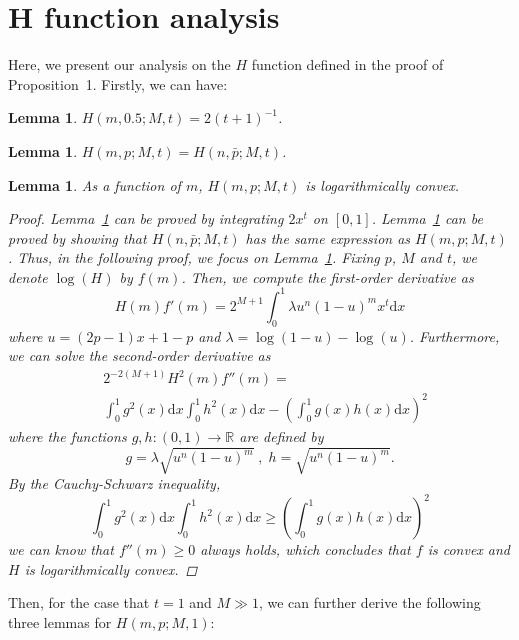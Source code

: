 \documentclass{article}
\newtheorem{lemma}[theorem]{Lemma}
\begin{document}
\section{H function analysis}
Here, we present our analysis on the $H$ function defined in the proof of Proposition~1.
Firstly, we can have:
\begin{lemma}
\label{MidPoint}
$H(m,0.5;M,t) = 2(t+1)^{-1}$.
\end{lemma}
\begin{lemma}
\label{Symmetry}
$H(m,p;M,t) = H(n, \bar{p};M,t)$.
\end{lemma}
\begin{lemma}
\label{LogConvexity}
As a function of $m$, $H(m,p;M,t)$ is logarithmically convex.
\begin{proof}
Lemma~\ref{MidPoint} can be proved by integrating $2 x^t$ on $[0,1]$.
Lemma~\ref{Symmetry} can be proved by showing that $H(n, \bar{p};M,t)$ has the same expression as $H(m,p;M,t)$.
Thus, in the following proof, we focus on Lemma~\ref{LogConvexity}. Fixing $p$, $M$ and $t$, we denote $\log (H)$ by $f(m)$. Then, we compute the first-order derivative as
\begin{equation}
H(m)f'(m)=2^{M+1}\int_{0}^{1}\lambda u^{n}(1-u)^{m}x^t\mathrm{d}x
\end{equation}
where $u= (2p-1)x+1-p$ and $\lambda=\log(1-u)-\log(u)$. Furthermore, we can solve the second-order derivative as
\begin{equation}
\begin{split}
&2^{-2(M+1)}H^2(m)f''(m)=\\
&\int_{0}^{1}g^2(x)\mathrm{d}x\int_{0}^{1}h^2(x)\mathrm{d}x-\left(\int_{0}^{1}g(x)h(x)\mathrm{d}x\right)^2
\end{split}
\end{equation}
where the functions $g,h:(0,1)\rightarrow  \mathbb{R}$ are defined by
\begin{equation}
g=\lambda\sqrt{u^{n}(1-u)^{m}}\;, \; h = \sqrt{u^{n}(1-u)^{m}}.
\end{equation}
By the Cauchy-Schwarz inequality,
\begin{equation}
\int_{0}^{1}g^2(x)\mathrm{d}x\int_{0}^{1}h^2(x)\mathrm{d}x\geq \left(\int_{0}^{1}g(x)h(x)\mathrm{d}x\right)^2
\end{equation}
we can know that $f''(m)\geq 0$ always holds, which concludes that $f$ is convex and $H$ is logarithmically convex.
\end{proof}
\end{lemma}
Then, for the case that $t=1$ and $M\gg 1$, we can further derive the following three lemmas for $H(m,p;M,1)$:
\end{document}
